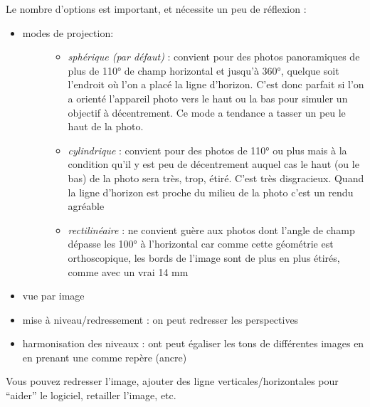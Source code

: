 \documentclass[a4paper,12pt,french]{sphinxmanual}
\begin{document}
Le nombre d'options est important, et nécessite un peu de réflexion :
\begin{itemize}
\item {} \begin{description}
\item[{modes de projection:}] \leavevmode\begin{itemize}
\item {} 
\emph{sphérique (par défaut)} : convient pour des photos panoramiques de plus de 110° de champ horizontal et jusqu'à 360°, quelque soit l'endroit où l'on a placé la ligne d'horizon. C'est donc parfait si l'on a orienté l'appareil photo vers le haut ou la bas pour simuler un objectif à décentrement. Ce mode a tendance a tasser un peu le haut de la photo.

\item {} 
\emph{cylindrique} : convient pour des photos de 110° ou plus mais à la condition qu'il y est peu de décentrement auquel cas le haut (ou le bas) de la photo sera très, trop, étiré. C'est très disgracieux. Quand la ligne d'horizon est proche du milieu de la photo c'est un rendu agréable

\item {} 
\emph{rectilinéaire} : ne convient guère aux photos dont l'angle de champ dépasse les 100° à l'horizontal car comme cette géométrie est orthoscopique, les bords de l'image sont de plus en plus étirés, comme avec un vrai 14 mm

\end{itemize}

\end{description}

\item {} 
vue par image

\item {} 
mise à niveau/redressement : on peut redresser les perspectives

\item {} 
harmonisation des niveaux : ont peut égaliser les tons de différentes images en en prenant une comme repère (ancre)

\end{itemize}

Vous pouvez redresser l'image, ajouter des ligne verticales/horizontales pour ``aider'' le logiciel, retailler l'image, etc.
\end{document}
